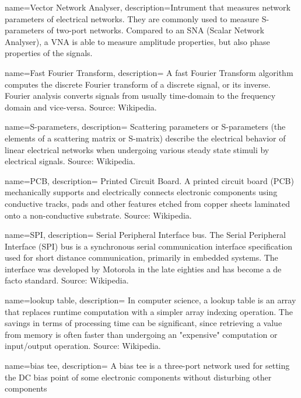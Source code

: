 {
  name=Vector Network Analyser,
  description={Intrument that measures network parameters of electrical networks.
  They are commonly used to measure S-parameters of two-port networks.
  Compared to an SNA (Scalar Network Analyser), a VNA is able to measure amplitude
  properties, but also phase properties of the signals.}
}

{
  name=Fast Fourier Transform,
  description={
  A fast Fourier Transform algorithm computes the discrete Fourier transform
  of a discrete signal, or its inverse. Fourier analysis converts signals
  from usually time-domain to the frequency domain and vice-versa.
  Source: Wikipedia.
  }
}

{
  name=S-parameters,
  description={
  Scattering parameters or S-parameters (the elements of a scattering matrix or S-matrix)
  describe the electrical behavior of linear electrical networks when undergoing
  various steady state stimuli by electrical signals.
  Source: Wikipedia.
  }
}

{
  name=PCB,
  description={
  Printed Circuit Board.
  A printed circuit board (PCB) mechanically supports and electrically connects
  electronic components using conductive tracks, pads and other features etched
  from copper sheets laminated onto a non-conductive substrate.
  Source: Wikipedia.
  }
}

{
  name=SPI,
  description={
  Serial Peripheral Interface bus.
  The Serial Peripheral Interface (SPI) bus is a synchronous serial
  communication interface specification used for short distance communication,
  primarily in embedded systems. The interface was developed by Motorola in the
  late eighties and has become a de facto standard.
  Source: Wikipedia.
  }
}

{
  name=lookup table,
  description={
    In computer science, a lookup table is an array that replaces runtime
    computation with a simpler array indexing operation. The savings in terms of
    processing time can be significant, since retrieving a value from memory is
    often faster than undergoing an "expensive" computation or input/output
    operation.
    Source: Wikipedia.
  }
}

{
  name=bias tee,
  description={
    A bias tee is a three-port network used for setting the DC bias point of
    some electronic components without disturbing other components
  }
}

